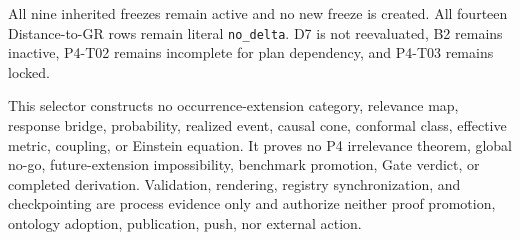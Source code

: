 \documentclass[11pt]{article}
\begin{document}
All nine inherited freezes remain active and no new freeze is created. All
fourteen Distance-to-GR rows remain literal \texttt{no\_delta}. D7 is not
reevaluated, B2 remains inactive, P4-T02 remains incomplete for plan
dependency, and P4-T03 remains locked.

This selector constructs no occurrence-extension category, relevance map,
response bridge, probability, realized event, causal cone, conformal class,
effective metric, coupling, or Einstein equation. It proves no P4
irrelevance theorem, global no-go, future-extension impossibility, benchmark
promotion, Gate verdict, or completed derivation. Validation, rendering,
registry synchronization, and checkpointing are process evidence only and
authorize neither proof promotion, ontology adoption, publication, push, nor
external action.
\end{document}
